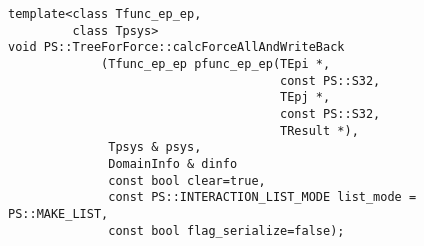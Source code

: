 \label{sec:module_standard_treeforforce_calcforceallandwriteback}

\begin{screen}
\begin{verbatim}
template<class Tfunc_ep_ep,
         class Tpsys>
void PS::TreeForForce::calcForceAllAndWriteBack
             (Tfunc_ep_ep pfunc_ep_ep(TEpi *,
                                      const PS::S32,
                                      TEpj *,
                                      const PS::S32,
                                      TResult *),
              Tpsys & psys,
              DomainInfo & dinfo
              const bool clear=true,
              const PS::INTERACTION_LIST_MODE list_mode = PS::MAKE_LIST,
              const bool flag_serialize=false);
\end{verbatim}
\end{screen}

